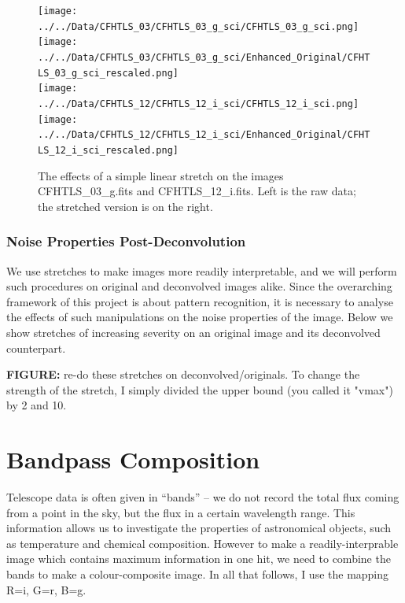 \documentclass[letterpaper, 11pt]{article}
\def\FIG#1{{\bf FIGURE: }{#1}}
\begin{document}
\begin{figure}[h]
	\centering
	\texttt{[image: ../../Data/CFHTLS\_03/CFHTLS\_03\_g\_sci/CFHTLS\_03\_g\_sci.png]}	
	\texttt{[image: ../../Data/CFHTLS\_03/CFHTLS\_03\_g\_sci/Enhanced\_Original/CFHTLS\_03\_g\_sci\_rescaled.png]}\\\vspace{1mm}	
	\texttt{[image: ../../Data/CFHTLS\_12/CFHTLS\_12\_i\_sci/CFHTLS\_12\_i\_sci.png]}	
	\texttt{[image: ../../Data/CFHTLS\_12/CFHTLS\_12\_i\_sci/Enhanced\_Original/CFHTLS\_12\_i\_sci\_rescaled.png]}
	\caption{The effects of a simple linear stretch on the images CFHTLS\_03\_g.fits and CFHTLS\_12\_i.fits. Left is the raw data; the stretched version is on the right.}
	\label{fig:linear_stretch}
\end{figure}


\subsubsection{Noise Properties Post-Deconvolution}

We use stretches to make images more readily interpretable, and we will perform such procedures on original and deconvolved images alike. Since the overarching framework of this project is about pattern recognition, it is necessary to analyse the effects of such manipulations on the noise properties of the image. Below we show stretches of increasing severity on an original image and its deconvolved counterpart.

\FIG{re-do these stretches on deconvolved/originals. To change the strength of the stretch, I simply divided the upper bound (you called it "vmax") by 2 and 10.}






\newpage
\section{Bandpass Composition}
\label{sec:colour}

Telescope data is often given in ``bands'' -- we do not record the total flux coming from a point in the sky, but the flux in a certain wavelength range. This information allows us to investigate the properties of astronomical objects, such as temperature and chemical composition. However to make a readily-interprable image which contains maximum information in one hit, we need to combine the bands to make a colour-composite image. In all that follows, I use the mapping R=i, G=r, B=g.
\end{document}
